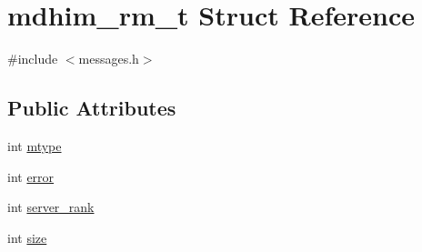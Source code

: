 \hypertarget{structmdhim__rm__t}{\section{mdhim\-\_\-rm\-\_\-t Struct Reference}
\label{structmdhim__rm__t}
}


{\ttfamily \#include $<$messages.\-h$>$}

\subsection*{Public Attributes}
\begin{DoxyCompactItemize}
\item 
int \hyperlink{structmdhim__rm__t_ad4fc1bc6965fe36cf6bef6c2813dba8d}{mtype}
\item 
int \hyperlink{structmdhim__rm__t_af7305ef9c55d3d60b91610408a88893f}{error}
\item 
int \hyperlink{structmdhim__rm__t_a8c6b340ab11d8fb8c7d8540cb59d9246}{server\-\_\-rank}
\item 
int \hyperlink{structmdhim__rm__t_addf21a3b828da693b9953e4a0d7d0c21}{size}
\end{DoxyCompactItemize}


